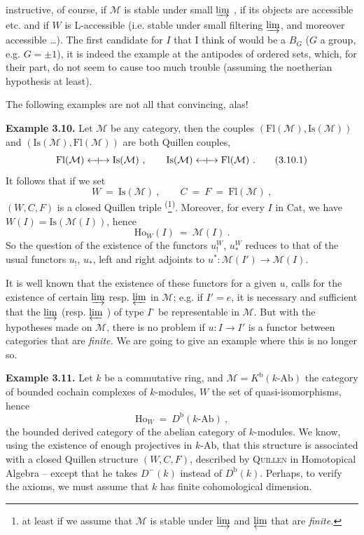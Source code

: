 \documentclass[11pt]{article}
\newcommand{\printedpage}[1]{\marginpar{\footnotesize p.~#1}}
\newcommand{\msp}[1]{\marginpar{\footnotesize [#1]}}
\newcommand{\limind}{\varinjlim}
\newcommand{\limproj}{\varprojlim}
\newcommand{\Fl}{\mathrm{Fl}}
\newcommand{\Is}{\mathrm{Is}}
\newcommand{\Ho}{\mathrm{Ho}}
\newcommand{\Qcouple}{\mathrel{\leftarrow\mkern-9mu{+}\mkern-9mu\rightarrow}}
\begin{document}
\printedpage{24}
\msp{page 43}
instructive, of course, if $\mathcal{M}$ is stable under small $\limind$ , if its objects are accessible etc. and if $W$ is L-accessible (i.e. stable under small filtering $\limind$, and moreover accessible \dots). The first candidate for $I$ that I think of would be a $B_G$ ($G$ a group, e.g. $G=\pm1$), it is indeed the example at the antipodes of ordered sets, which, for their part, do not seem to cause too much trouble (assuming the noetherian hypothesis at least).

The following examples are not all that convincing, alas!

\textbf{Example 3.10.} Let $\mathcal{M}$ be any category, then the couples $(\Fl(\mathcal{M}),\Is(\mathcal{M}))$ and $(\Is(\mathcal{M}),\Fl(\mathcal{M}))$ are both Quillen couples,
\[
\Fl(\mathcal{M}) \Qcouple \Is(\mathcal{M}) \ , \qquad \Is(\mathcal{M}) \Qcouple \Fl(\mathcal{M}) \ . \tag*{(3.10.1)} %
\]
It follows that if we set
\[
W \ = \ \Is(\mathcal{M}) \ , \qquad C \ = \ F \ = \ \Fl(\mathcal{M}) \ , \tag*{(3.10.2)}
\]
$(W,C,F)$ is a closed Quillen triple \textsuperscript{(}\footnote[22]{at least if we assume that $\mathcal{M}$ is stable under $\limind$ and $\limproj$ that are \textit{finite.}}\textsuperscript{)}. Moreover, for every $I$ in Cat, we have $W(I)=\Is(\mathcal{M}(I))$, hence
\[
\Ho_W(I) \ = \ \mathcal{M}(I) \ . \tag*{(3.10.3)}
\]
So the question of the existence of the functors $u_!^W$, $u_*^W$ reduces to that of the usual functors $u_!$, $u_*$, left and right adjoints to $u^* : \mathcal{M}(I') \longrightarrow \mathcal{M}(I)$.

\msp{page 44}
It is well known that the existence of these functors for a given $u$, calls for the existence of certain $\limind$ resp. $\limproj$ in $\mathcal{M}$; e.g. if $I'=e$, it is necessary and sufficient that the $\limind$ (resp. $\limproj$ ) of type $I^\circ$ be representable in $\mathcal{M}$. But with the hypotheses made on $\mathcal{M}$, there is no problem if $u : I \longrightarrow I'$ is a functor between categories that are \textit{finite.} We are going to give an example where this is no longer so.

\textbf{Example 3.11.} Let $k$ be a commutative ring, and $\mathcal{M}=K^{\mathrm{b}}(k\text{-Ab})$ the category of bounded cochain complexes of $k$-modules, $W$ the set of quasi-isomorphisms, hence
\[
\Ho_W \ = \ D^{\mathrm{b}}(k\text{-Ab}) \ ,
\]
the bounded derived category of the abelian category of $k$-modules. We know, using the existence of enough projectives in $k$-Ab, that this structure is associated with a closed Quillen structure $(W,C,F)$, described by \textsc{Quillen}
\msp{page 45}
in Homotopical Algebra -- except that he takes $D^-(k)$ instead of $D^{\mathrm{b}}(k)$. Perhaps, to verify the axioms, we must assume that $k$ has finite cohomological dimension.
\end{document}
